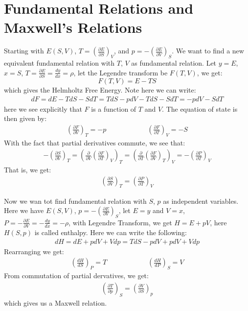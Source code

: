 \documentclass[11pt,oneside]{book}
\theoremstyle{break}
\theoremstyle{break}
\newcommand{\pd}{\partial}
\newcommand{\lr}[1]{\left( #1 \right)}
\begin{document}
\section[Fundamental Relations and Maxwell's Relations]{\color{red}Fundamental Relations and Maxwell's Relations\color{black}}
Starting with $E(S,V)$, $T = \lr{\frac{\pd E}{\pd S}}_V$, and $p = - \lr{\frac{\pd E}{\pd V}}_S$. We want to find a new equivalent fundamental relation with $T$, $V$ as fundamental relation. Let $y=E$, $x=S$, $T = \frac{\pd E}{\pd S} = \frac{d y}{dx} = \rho$, let the Legendre transform be $F(T,V)$, we get: $$F(T,V) = E- TS$$ 
which gives the Helmholtz Free Energy. Note here we can write:
\begin{align*}
dF = dE - TdS - SdT = TdS - pdV - TdS - SdT = -pdV - SdT
\end{align*}
here we see explicitly that $F$ is a function of $T$ and $V$. The equation of state is then given by:
\begin{align*}
\left(\frac{\pd F}{\pd V} \right)_T = -p \qquad \qquad \qquad \lr{\frac{\pd F}{\pd T}}_V = -S
\end{align*}
With the fact that partial derivatives commute, we see that:
\begin{align*}
 -\lr{\frac{\pd S}{\pd V}}_T =\left(\frac{\pd}{\pd V} \left(\frac{\pd F}{\pd T} \right)_V\right)_T = \lr{\frac{\pd}{\pd T} \lr{\frac{\pd F}{\pd V}}_T}_V = -\lr{\frac{\pd P}{\pd T}}_V
\end{align*}
That is, we get:
\begin{align*}
\lr{\frac{\pd S}{\pd V}}_T = \lr{\frac{\pd P}{\pd T}}_V
\end{align*}

Now we wan tot find fundamental relation with $S$, $p$ as independent variables. Here we have $E(S,V)$, $p = -\lr{\frac{\pd E}{\pd V}}_S$, let $E = y$ and $V = x$, $P = - \frac{\pd E}{\pd V} = -\frac{dy}{dx} = -\rho$, with Legendre Transform, we get $H = E+pV$, here $H(S,p)$ is called enthalpy. Here we can write the following:
\begin{align*}
dH = dE + pdV + Vdp = TdS - pdV + pdV + Vdp
\end{align*}
Rearranging we get:
\begin{align*}
\lr{\frac{dH}{dS}}_P = T \qquad \qquad \qquad \lr{\frac{dH}{dP}}_S = V
\end{align*}
From commutation of partial dervatives, we get:
\begin{align*}
\lr{\frac{\pd T}{\pd p}}_S = \lr{\frac{\pd V}{\pd S}}_p
\end{align*}
which gives us a Maxwell relation. \\
\end{document}
